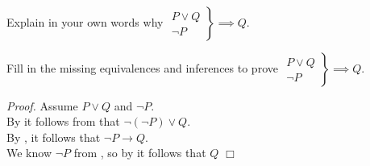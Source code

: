 \begin{exer}[\exerU] %
\label{exer_or_form_mp}
~
    \begin{exerpart}
        \item Explain in your own words why $\left. \begin{array} {cc} P \lor Q \\ \neg P \end{array} \right\} \implies Q$.
        \item Fill in the missing equivalences and inferences to prove $\left. \begin{array} {cc} P \lor Q \\ \neg P \end{array} \right\} \implies Q$.

            \emph{Proof.}  Assume  $ P\lor Q$ and  $\neg P$.  \\
            By \underline{\hspace{.75 in}} it follows from  that $\neg (\neg P) \lor Q$.  \\
            By \underline{\hspace{.75 in}}, it follows that $\neg P \to Q$.  \\
            We know $\neg P$ from , so by \underline{\hspace{.75 in}} it follows that $Q$ \hfill $\Box$
    \end{exerpart}
\end{exer}

